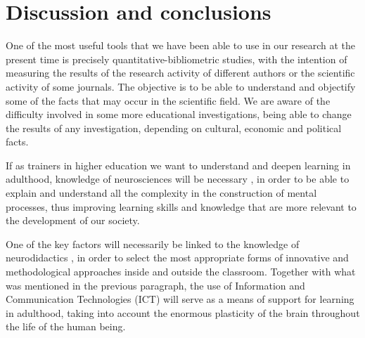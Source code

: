 \documentclass[english]{textolivre}
\begin{document}
\section{Discussion and conclusions}

One of the most useful tools that we have been able to use in our research at the present time is precisely quantitative-bibliometric studies, with the intention of measuring the results of the research activity of different authors or the scientific activity of some journals. The objective is to be able to understand and objectify some of the facts that may occur in the scientific field. We are aware of the difficulty involved in some more educational investigations, being able to change the results of any investigation, depending on cultural, economic and political facts.

If as trainers in higher education we want to understand and deepen learning in adulthood, knowledge of neurosciences will be necessary \cite{campos_neuroeducacion:_2010,codina_felip_neuroeducacion_2015,barrios_tao_neurociencias_2016}, in order to be able to explain and understand all the complexity in the construction of mental processes, thus improving learning skills and knowledge that are more relevant to the development of our society.

One of the key factors will necessarily be linked to the knowledge of neurodidactics \cite{fernandez_palacio_neurodidactica_2017,benavidez__importancia_2019,eyzaguirre_estrategia_2020}, in order to select the most appropriate forms of innovative and methodological approaches inside and outside the classroom. Together with what was mentioned in the previous paragraph, the use of Information and Communication Technologies (ICT) will serve as a means of support for learning in adulthood, taking into account the enormous plasticity of the brain throughout the life of the human being.
\end{document}
